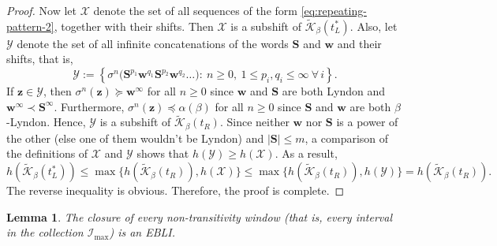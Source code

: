 \documentclass[11pt]{amsart}
\newtheorem{lemma}[theorem]{Lemma}
\theoremstyle{definition}
\theoremstyle{remark}
\numberwithin{equation}{section}
\newcommand{\II}{\mathcal{I}}
\newcommand{\Kt}{\widetilde{\mathcal{K}}}
\newcommand{\cs}{ {\mathbf{S}}}
\newcommand{\w}{\mathbf{w}}
\newcommand{\z}{\mathbf{z}}
\newcommand{\f}{\infty}
\newcommand{\al}{\alpha}
\newcommand{\lle}{\preccurlyeq}
\newcommand{\lge}{\succcurlyeq}
\newcommand{\si}{\sigma}
\begin{document}
\begin{proof}
Now let $\mathcal{X}$ denote the set of all sequences of the form \eqref{eq:repeating-pattern-2}, together with their shifts. Then $\mathcal{X}$ is a subshift of $\Kt_\beta(t_L^*)$. Also, let $\mathcal{Y}$ denote the set of all infinite concatenations of the words $\cs$ and $\w$ and their shifts, that is,
\[
\mathcal{Y}:=\left\{\si^n\big(\cs^{p_1}\w^{q_1}\cs^{p_2}\w^{q_2}\dots\big): \ n\geq 0,\ 1\leq p_i,q_i\leq\f\ \forall\,i\right\}.
\]
If $\z\in\mathcal{Y}$, then $\si^n(\z)\lge \w^\f$ for all $n\geq 0$ since $\w$ and $\cs$ are both Lyndon and $\w^\f\prec \cs^\f$. Furthermore, $\si^n(\z)\lle \al(\beta)$ for all $n\geq 0$ since $\cs$ and $\w$ are both $\beta$-Lyndon. Hence, $\mathcal{Y}$ is a subshift of $\Kt_\beta(t_R)$. Since neither $\w$ nor $\cs$ is a power of the other (else one of them wouldn't be Lyndon) and $|\cs|\leq m$, a comparison of the definitions of $\mathcal{X}$ and $\mathcal{Y}$ shows that $h(\mathcal{Y})\geq h(\mathcal{X})$. As a result,
\[
h(\Kt_\beta(t_L^*))\leq \max\{h(\Kt_\beta(t_R)),h(\mathcal{X})\}\leq \max\{h(\Kt_\beta(t_R)),h(\mathcal{Y})\}=h(\Kt_\beta(t_R)).
\]
The reverse inequality is obvious. Therefore, the proof is complete.
\end{proof}

\begin{lemma} \label{lem:window-is-EBLI}
The closure of every non-transitivity window (that is, every interval in the collection $\II_{\max}$) is an EBLI.
\end{lemma}
\end{document}
